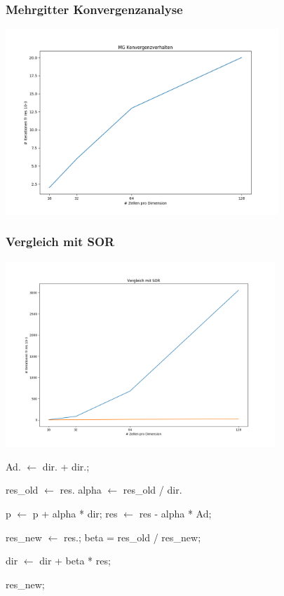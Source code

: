 \documentclass[]{beamer}
\begin{document}
\begin{frame}
  \frametitle{Mehrgitter Konvergenzanalyse}
  \begin{center}
    \includegraphics[width=0.9\linewidth, height=7cm]{mg_konvergenzverhalten.png}
  \end{center}
\end{frame}

\begin{frame}
  \frametitle{Vergleich mit SOR}
  \begin{center}
    \includegraphics[width=0.9\linewidth, height=7cm]{mg_vs_sor.png}
  \end{center}
\end{frame}


\begin{frame}
  \begin{algorithmic}
     \State Ad. $\gets$ dir. + dir.;
    \EndFor
    
    \State res\_old $\gets$ res.
    \State alpha $\gets $ res\_old / dir.
    

     \State p $\gets$ p + alpha * dir;
     \State res $\gets$ res - alpha * Ad;

    
    \State res\_new $\gets$ res.;
    \State beta = res\_old / res\_new;

    \State dir $\gets$ dir + beta * res;
 
    \Return res\_new;
    \EndFunction
  \end{algorithmic}
\end{frame}
\end{document}
